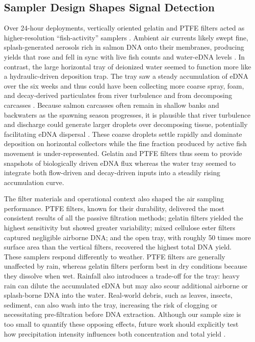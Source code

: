 \documentclass{article}
\begin{document}
\subsection{Sampler Design Shapes Signal Detection}
Over 24-hour deployments, vertically oriented gelatin and PTFE filters acted as higher-resolution “fish-activity” samplers \cite{jager2025}. Ambient air currents likely swept fine, splash-generated aerosols rich in salmon DNA onto their membranes, producing yields that rose and fell in sync with live fish counts and water-eDNA levels \cite{blanchard1980}. In contrast, the large horizontal tray of deionized water seemed to function more like a hydraulic-driven deposition trap. The tray saw a steady accumulation of eDNA over the six weeks and thus could have been collecting more coarse spray, foam, and decay-derived particulates from river turbulence and from decomposing carcasses \cite{hinds2022,prather2013}. Because salmon carcasses often remain in shallow banks and backwaters as the spawning season progresses, it is plausible that river turbulence and discharge could generate larger droplets over decomposing tissue, potentially facilitating eDNA dispersal \cite{wood2021,herman2023}. These coarse droplets settle rapidly and dominate deposition on horizontal collectors while the fine fraction produced by active fish movement is under-represented. Gelatin and PTFE filters thus seem to provide snapshots of biologically driven eDNA flux whereas the water tray seemed to integrate both flow-driven and decay-driven inputs into a steadily rising accumulation curve.

The filter materials and operational context also shaped the air sampling performance. PTFE filters, known for their durability, delivered the most consistent results of all the passive filtration methods; gelatin filters yielded the highest sensitivity but showed greater variability; mixed cellulose ester filters captured negligible airborne DNA; and the open tray, with roughly 50 times more surface area than the vertical filters, recovered the highest total DNA yield. These samplers respond differently to weather. PTFE filters are generally unaffected by rain, whereas gelatin filters perform best in dry conditions because they dissolve when wet. Rainfall also introduces a trade-off for the tray: heavy rain can dilute the accumulated eDNA but may also scour additional airborne or splash-borne DNA into the water. Real-world debris, such as leaves, insects, sediment, can also wash into the tray, increasing the risk of clogging or necessitating pre-filtration before DNA extraction. Although our sample size is too small to quantify these opposing effects, future work should explicitly test how precipitation intensity influences both concentration and total yield \cite{johnson2023}. 
\end{document}
